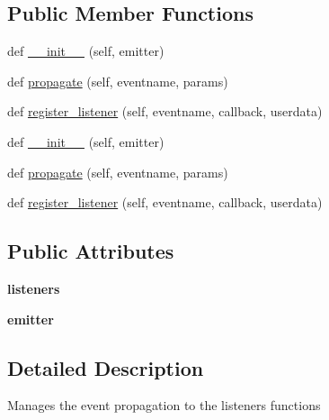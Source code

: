 \subsection*{Public Member Functions}
\begin{DoxyCompactItemize}
\item 
def \hyperlink{classremi_1_1gui_1_1__EventManager_a16be9ca73a8345abe44c9fc8593239ed}{\+\_\+\+\_\+init\+\_\+\+\_\+} (self, emitter)
\item 
def \hyperlink{classremi_1_1gui_1_1__EventManager_a586d13aa22f66990a6377a7d0b922c4e}{propagate} (self, eventname, params)
\item 
def \hyperlink{classremi_1_1gui_1_1__EventManager_a2200dc060a578b6cc9b0ac2ced29cea2}{register\+\_\+listener} (self, eventname, callback, userdata)
\item 
def \hyperlink{classremi_1_1gui_1_1__EventManager_a16be9ca73a8345abe44c9fc8593239ed}{\+\_\+\+\_\+init\+\_\+\+\_\+} (self, emitter)
\item 
def \hyperlink{classremi_1_1gui_1_1__EventManager_a586d13aa22f66990a6377a7d0b922c4e}{propagate} (self, eventname, params)
\item 
def \hyperlink{classremi_1_1gui_1_1__EventManager_a2200dc060a578b6cc9b0ac2ced29cea2}{register\+\_\+listener} (self, eventname, callback, userdata)
\end{DoxyCompactItemize}
\subsection*{Public Attributes}
\begin{DoxyCompactItemize}
\item 
{\bfseries listeners}\hypertarget{classremi_1_1gui_1_1__EventManager_adbe7ac1e7d9371d449324dd7367f4291}{}\label{classremi_1_1gui_1_1__EventManager_adbe7ac1e7d9371d449324dd7367f4291}

\item 
{\bfseries emitter}\hypertarget{classremi_1_1gui_1_1__EventManager_af5929a97e1e1cda794976de6f0b1155f}{}\label{classremi_1_1gui_1_1__EventManager_af5929a97e1e1cda794976de6f0b1155f}

\end{DoxyCompactItemize}


\subsection{Detailed Description}
\begin{DoxyVerb}Manages the event propagation to the listeners functions\end{DoxyVerb}
 

